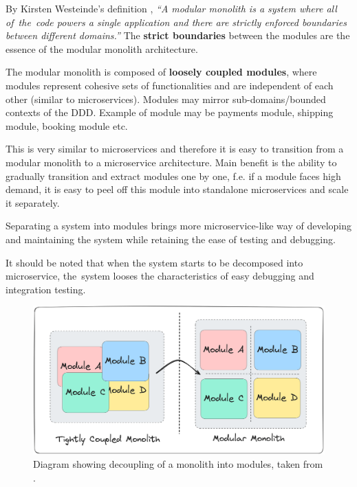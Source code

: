 By Kirsten Westeinde's definition \cite{kirsten_westende:modular_monolith}, \textit{``A modular monolith is a system where all of~the~code powers a single application and there are strictly enforced boundaries between different domains.''} The \textbf{strict boundaries} between the modules are the essence of the modular monolith architecture.

The modular monolith is composed of \textbf{loosely coupled modules}, where modules represent cohesive sets of functionalities and are independent of each other (similar to microservices). Modules may mirror sub-domains/bounded contexts of the DDD. Example of module may be payments module, shipping module, booking module etc.

This is very similar to microservices and therefore it is easy to transition from a modular monolith to a microservice architecture. Main benefit is the ability to gradually transition and extract modules one by one, f.e. if a module faces high demand, it is easy to peel off this module into standalone microservices and scale it separately.

Separating a system into modules brings more microservice-like way of developing and maintaining the system while retaining the ease of testing and debugging.

It should be noted that when the system starts to be decomposed into microservice, the~system looses the characteristics of easy debugging and integration testing. 

\begin{figure} [H]
    \centering
    \includegraphics[width=\textwidth]{figures/m_to_mm.png}
    \caption{Diagram showing decoupling of a monolith into modules, taken from \cite{milan_jovanovic:modular_monolith_communication_patterns}.}
    \label{fig:arch:m_to_mm}
\end{figure}

